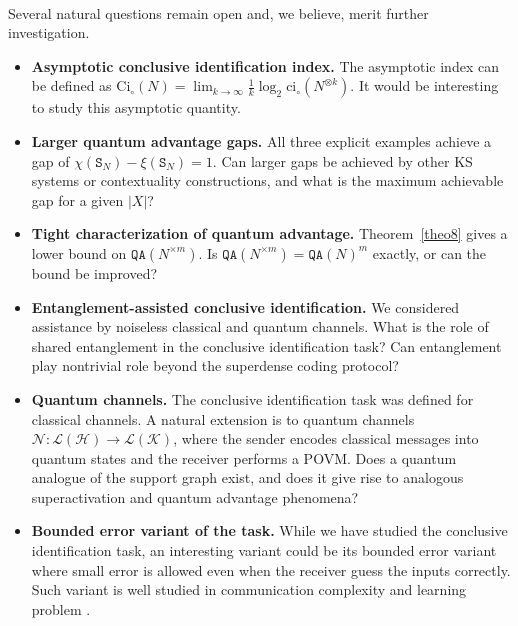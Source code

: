 \documentclass[12pt,a4paper]{article}
\begin{document}
\vspace{-.25cm}\\ 

\noindent Several natural questions remain open and, we believe, merit further investigation.

\begin{itemize}[itemsep=-0.15cm, parsep=0.15cm, topsep=2pt, leftmargin=1.0cm]
\item[1)] \textbf{Asymptotic conclusive identification index.} The asymptotic index can be defined as $\mathrm{Ci}_\circ(N) = \lim_{k \to \infty} \frac{1}{k} \log_2 \mathrm{ci}_\circ(N^{\otimes k})$. It would be interesting to study this asymptotic quantity. 
\item[2)] \textbf{Larger quantum advantage gaps.} All three explicit examples achieve a gap of $\chi(\mathtt{S}_N) - \xi(\mathtt{S}_N) = 1$. Can larger gaps be achieved by other KS systems or contextuality constructions, and what is the maximum achievable gap for a given $|X|$?
\item[3)] \textbf{Tight characterization of quantum advantage.} Theorem~\ref{theo8} gives a lower bound on $\mathtt{QA}(N^{\times m})$. Is $\mathtt{QA}(N^{\times m}) = \mathtt{QA}(N)^m$ exactly, or can the bound be improved?
\item[4)] \textbf{Entanglement-assisted conclusive identification.} We considered assistance by noiseless classical and quantum channels. What is the role of shared entanglement in the conclusive identification task? Can entanglement play nontrivial role beyond the superdense coding protocol?
\item[5)] \textbf{Quantum channels.} The conclusive identification task was defined for classical channels. A natural extension is to quantum channels $\mathcal{N} : \mathcal{L}(\mathcal{H}) \to \mathcal{L}(\mathcal{K})$, where the sender encodes classical messages into quantum states and the receiver performs a POVM. Does a quantum analogue of the support graph exist, and does it give rise to analogous superactivation and quantum advantage phenomena?
\item[6)] \textbf{Bounded error variant of the task.} While we have studied the conclusive identification task, an interesting variant could be its bounded error variant where small error is allowed even when the receiver guess the inputs correctly. Such variant is well studied in communication complexity \cite{Gavinsky2006} and learning problem \cite{Regev2009}.   
\end{itemize}
\end{document}
